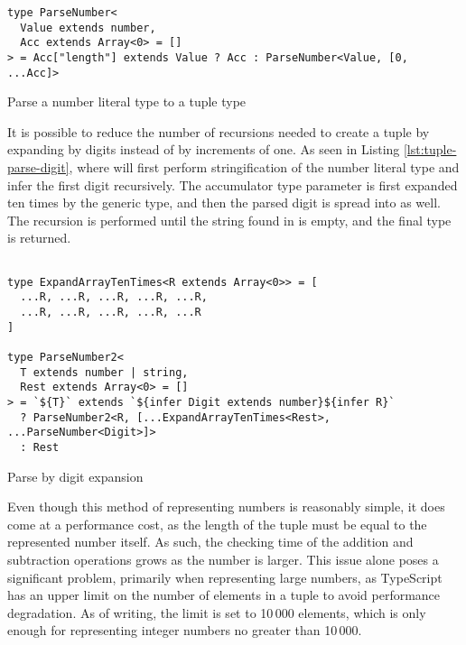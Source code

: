\begin{listing}[ht]
  \begin{verbatim}
type ParseNumber<
  Value extends number,
  Acc extends Array<0> = []
> = Acc["length"] extends Value ? Acc : ParseNumber<Value, [0, ...Acc]>
\end{verbatim}
  \caption{Parse a number literal type to a tuple type}\label{lst:tuple-parse}
\end{listing}

It is possible to reduce the number of recursions needed to create a tuple by expanding by digits instead of by increments of one. As seen in Listing \ref{lst:tuple-parse-digit}, where  will first perform stringification of the number literal type  and infer the first digit recursively. The accumulator type parameter  is first expanded ten times by the  generic type, and then the parsed digit is spread into  as well. The recursion is performed until the string found in  is empty, and the final  type is returned.

\begin{listing}[ht]
  \begin{verbatim}

type ExpandArrayTenTimes<R extends Array<0>> = [
  ...R, ...R, ...R, ...R, ...R,
  ...R, ...R, ...R, ...R, ...R
]
    
type ParseNumber2<
  T extends number | string,
  Rest extends Array<0> = []
> = `${T}` extends `${infer Digit extends number}${infer R}`
  ? ParseNumber2<R, [...ExpandArrayTenTimes<Rest>, ...ParseNumber<Digit>]>
  : Rest
\end{verbatim}
  \caption{Parse by digit expansion}\label{lst:tuple-parse-digit}
\end{listing}

Even though this method of representing numbers is reasonably simple, it does come at a performance cost, as the length of the tuple must be equal to the represented number itself. As such, the checking time of the addition and subtraction operations grows as the number is larger. This issue alone poses a significant problem, primarily when representing large numbers, as TypeScript has an upper limit on the number of elements in a tuple to avoid performance degradation. As of writing, the limit is set to 10\,000 elements\cite{ImplementationCheckerTs2023}, which is only enough for representing integer numbers no greater than 10\,000.

\clearpage

